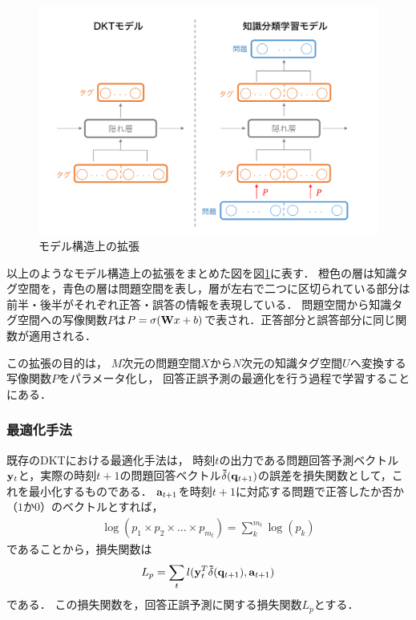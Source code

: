 \begin{figure}[htb]
\begin{center}
	\includegraphics[width=360pt]{./img/model.png}
	\caption{モデル構造上の拡張}
	\label{fig:model}
\end{center}
\end{figure}

以上のようなモデル構造上の拡張をまとめた図を図\ref{fig:model}に表す．
橙色の層は知識タグ空間を，青色の層は問題空間を表し，層が左右で二つに区切られている部分は前半・後半がそれぞれ正答・誤答の情報を表現している．
問題空間から知識タグ空間への写像関数$P$は$P=\sigma({\bf W} x + b)$で表され．正答部分と誤答部分に同じ関数が適用される．

この拡張の目的は，
$M$次元の問題空間$X$から$N$次元の知識タグ空間$U$へ変換する写像関数$P$をパラメータ化し，
回答正誤予測の最適化を行う過程で学習することにある．



\subsubsection{最適化手法}
既存のDKTにおける最適化手法は，
時刻$t$の出力である問題回答予測ベクトル${\bf y}_t$と，実際の時刻$t+1$の問題回答ベクトル${\bf\tilde{ \delta}}({\bf q}_{t+1})$の誤差を損失関数として，これを最小化するものである．
${\bf a}_{t+1}$を時刻$t+1$に対応する問題で正答したか否か（$1$か$0$）のベクトルとすれば，
\begin{eqnarray}
\label{eq:log_sum}
{\log(p_1 \times p_2 \times \dots \times p_{m_t}) = \sum_{k}^{m_t} \log(p_k)}
\end{eqnarray}
であることから，損失関数は
\begin{eqnarray}
\label{eq:prediction_entropy}
{L_p = \sum_t l({\bf y}_t^T {\bf \tilde{\delta}}({\bf q}_{t+1}), {\bf a}_{t+1})}
\end{eqnarray}
である．
この損失関数を，回答正誤予測に関する損失関数$L_p$とする．


